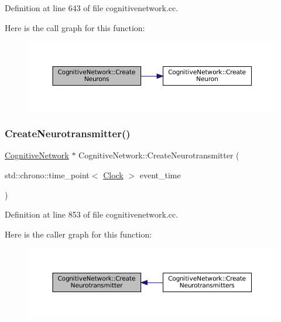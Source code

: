 Definition at line 643 of file cognitivenetwork.\+cc.

Here is the call graph for this function\+:\nopagebreak
\begin{figure}[H]
\begin{center}
\leavevmode
\includegraphics[width=350pt]{class_cognitive_network_af9b2a136584c962e44114a7ee3d2804a_cgraph}
\end{center}
\end{figure}
\mbox{\label{class_cognitive_network_a53d1047ae3ec721540b64b05abe01559}} 
\subsubsection{\texorpdfstring{Create\+Neurotransmitter()}{CreateNeurotransmitter()}}
{\footnotesize\ttfamily \mbox{\hyperlink{class_cognitive_network}{Cognitive\+Network}} $\ast$ Cognitive\+Network\+::\+Create\+Neurotransmitter (\begin{DoxyParamCaption}\item[{std\+::chrono\+::time\+\_\+point$<$ \mbox{\hyperlink{universe_8h_a0ef8d951d1ca5ab3cfaf7ab4c7a6fd80}{Clock}} $>$}]{event\+\_\+time }\end{DoxyParamCaption})}



Definition at line 853 of file cognitivenetwork.\+cc.

Here is the caller graph for this function\+:\nopagebreak
\begin{figure}[H]
\begin{center}
\leavevmode
\includegraphics[width=350pt]{class_cognitive_network_a53d1047ae3ec721540b64b05abe01559_icgraph}
\end{center}
\end{figure}
\mbox{\label{class_cognitive_network_ad877c495c9efdb582613a5af8d854ac3}} 
